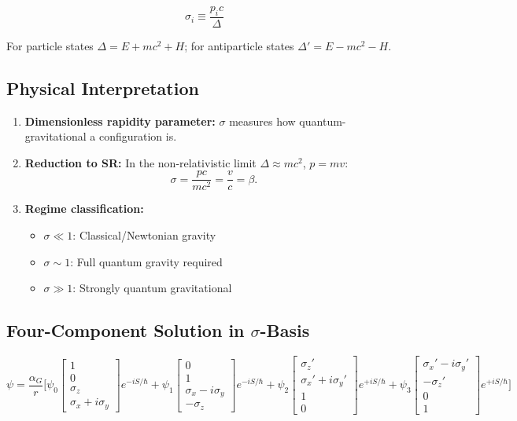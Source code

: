 \documentclass[11pt,a4paper]{article}
\theoremstyle{definition}
\theoremstyle{remark}
\begin{document}
	\begin{equation}
		\boxed{\sigma_i \equiv \frac{p_i c}{\Delta}}
		\label{eq:graviton_scalar}
	\end{equation}
	
	For particle states $\Delta=E+mc^2+H$; for antiparticle states $\Delta'=E-mc^2-H$.
	
	\subsection{Physical Interpretation}
	
	\begin{enumerate}
		\item \textbf{Dimensionless rapidity parameter:} $\sigma$ measures how quantum-gravitational a configuration is.
		\item \textbf{Reduction to SR:} In the non-relativistic limit $\Delta\approx mc^2$, $p=mv$:
		\begin{equation}
			\sigma = \frac{pc}{mc^2} = \frac{v}{c} = \beta.
		\end{equation}
		\item \textbf{Regime classification:}
		\begin{itemize}
			\item $\sigma\ll1$: Classical/Newtonian gravity
			\item $\sigma\sim1$: Full quantum gravity required
			\item $\sigma\gg1$: Strongly quantum gravitational
		\end{itemize}
	\end{enumerate}
	
	\subsection{Four-Component Solution in $\sigma$-Basis}
	
	\begin{equation}
		\psi = \frac{\alpha_G}{r}\Bigg[
		\psi_0\begin{bmatrix}1\\0\\\sigma_z\\\sigma_x+i\sigma_y\end{bmatrix}e^{-iS/\hbar}
		+\psi_1\begin{bmatrix}0\\1\\\sigma_x-i\sigma_y\\-\sigma_z\end{bmatrix}e^{-iS/\hbar}
		+\psi_2\begin{bmatrix}\sigma_z'\\\sigma_x'+i\sigma_y'\\1\\0\end{bmatrix}e^{+iS/\hbar}
		+\psi_3\begin{bmatrix}\sigma_x'-i\sigma_y'\\-\sigma_z'\\0\\1\end{bmatrix}e^{+iS/\hbar}
		\Bigg]
	\end{equation}
	
\end{document}
